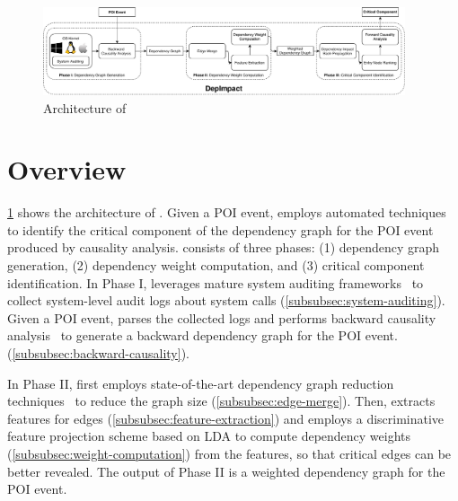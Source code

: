 \begin{figure}[t]
    \centering
    \includegraphics[width=0.95\textwidth,clip]{figs/architecture.pdf}
    \caption{Architecture of \tool}
    \label{fig:architecture}
\end{figure}


\section{Overview}
\label{sec:overview}



\cref{fig:architecture} shows the architecture of \tool.
%
Given a POI event, \tool employs automated techniques to identify the critical component of the dependency graph for the POI event produced by causality analysis.
%
\tool consists of three phases: (1) dependency graph generation, (2) dependency weight computation, and (3) critical component identification.
%
In Phase I, \tool leverages mature system auditing frameworks~\cite{auditd,etw,dtrace,sysdig}
to collect system-level audit logs about system calls (\cref{subsubsec:system-auditing}).
Given a POI event, \tool parses the collected logs and performs backward causality analysis~\cite{backtracking,backtracking2} to generate a backward dependency graph for the POI event. (\cref{subsubsec:backward-causality}).

%
In Phase II, \tool first employs state-of-the-art dependency graph reduction techniques~\cite{reduction} to reduce the graph size
(\cref{subsubsec:edge-merge}).
Then, \tool extracts features for edges (\cref{subsubsec:feature-extraction})
and employs a discriminative feature projection scheme based on LDA to compute dependency weights (\cref{subsubsec:weight-computation}) from the features, so that critical edges can be better revealed.
The output of Phase II is a weighted dependency graph for the POI event.

